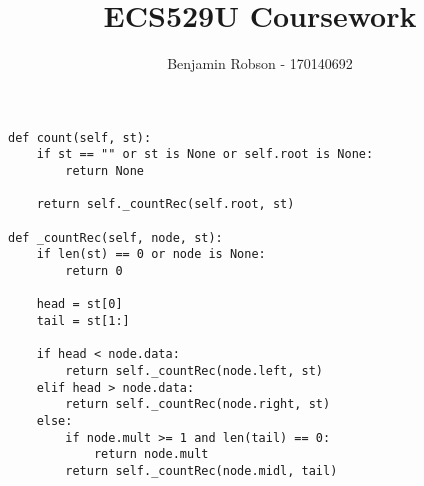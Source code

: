 \documentclass{article}
\title{ECS529U Coursework}
\author{Benjamin Robson - 170140692}
\date{}
\begin{document}
  \maketitle
  \newpage

  \begin{lstlisting}[frame=single, caption={Count function in word tree}, captionpos=b]
def count(self, st):
    if st == "" or st is None or self.root is None: 
        return None

    return self._countRec(self.root, st)

def _countRec(self, node, st):
    if len(st) == 0 or node is None: 
        return 0
    
    head = st[0]
    tail = st[1:]
    
    if head < node.data: 
        return self._countRec(node.left, st)
    elif head > node.data: 
        return self._countRec(node.right, st)
    else:
        if node.mult >= 1 and len(tail) == 0:
            return node.mult
        return self._countRec(node.midl, tail)
  \end{lstlisting}
  \newpage
\end{document}
